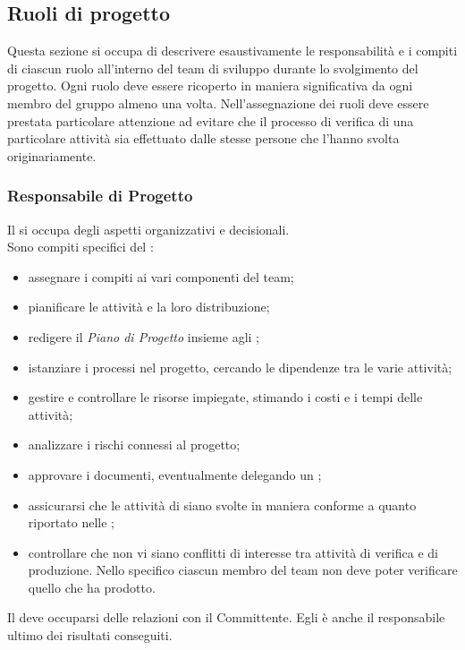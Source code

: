 \subsection{Ruoli di progetto}

Questa sezione si occupa di descrivere esaustivamente le responsabilità e i compiti di ciascun ruolo all'interno del team di sviluppo durante lo svolgimento del progetto.
Ogni ruolo deve essere ricoperto in maniera significativa da ogni membro del gruppo almeno una volta. Nell'assegnazione dei ruoli deve essere prestata particolare attenzione ad evitare che il processo di verifica di una particolare attività sia effettuato dalle stesse persone che l'hanno svolta originariamente.


\subsubsection{Responsabile di Progetto} \label{sec:responsabile}
Il \Responsabile{} si occupa degli aspetti organizzativi e decisionali.\\
Sono compiti specifici del \Responsabile:
\begin{itemize}
	\item assegnare i compiti ai vari componenti del team;
	\item pianificare le attività e la loro distribuzione;
	\item redigere il \textit{Piano di Progetto} insieme agli \Amministratori;
	\item istanziare i processi nel progetto, cercando le dipendenze tra le varie attività;
	\item gestire e controllare le risorse impiegate, stimando i costi e i tempi delle attività;
	\item analizzare i rischi connessi al progetto;
	\item approvare i documenti, eventualmente delegando un \Verificatore;
	\item assicurarsi che le attività di \VV{} siano svolte in maniera conforme a quanto riportato nelle \NormeDiProgetto;
	\item controllare che non vi siano conflitti di interesse tra attività di verifica e di produzione. Nello specifico ciascun membro del team non deve poter verificare quello che ha prodotto.
\end{itemize}
Il \Responsabile{} deve occuparsi delle relazioni con il Committente.
Egli è anche il responsabile ultimo dei risultati conseguiti.



